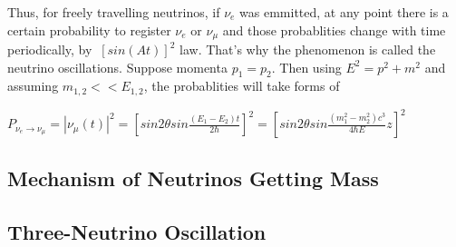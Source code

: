 Thus, for freely travelling neutrinos, if $\nu_e$ was emmitted, at any point there is a certain probability to register $\nu_e$ or $\nu_\mu$ and those probablities change with time periodically, by $~[sin(At)]^2$ law. That's why the phenomenon is called the neutrino oscillations.
Suppose momenta $p_1=p_2$. Then using $E^2=p^2+m^2$ and assuming $m_{1,2}<<E_{1,2}$, the probablities will take forms of\\
\begin{center}
$P_{\nu_e \rightarrow \nu_\mu}=|\nu_\mu(t)|^2=[{sin2\theta}sin{\frac{(E_1-E_2)t}{2\hbar}}]^2=[{sin2\theta}sin{\frac{(m_1^2-m_2^2)c^3}{4\hbar{E}}z}]^2$\\  
\end{center}

\subsection{Mechanism of Neutrinos Getting Mass}

\subsection{Three-Neutrino Oscillation}

